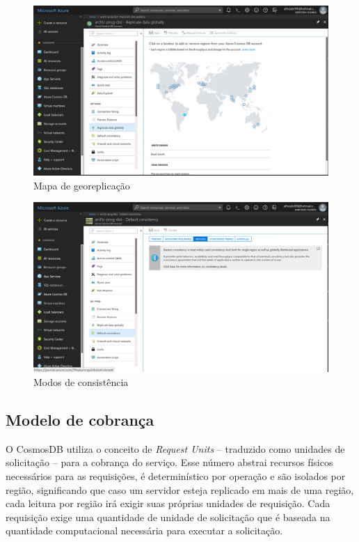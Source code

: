 \documentclass[12pt]{article}
\begin{document}
\begin{figure}[H]
	\label{fig:az4}
	\caption{Mapa de georeplicação}
	\includegraphics[scale=0.37]{img/az4.png}
	\centering
\end{figure}

\begin{figure}[H]
	\label{fig:az5}
	\caption{Modos de consistência}
	\includegraphics[scale=0.37]{img/az5.png}
	\centering
\end{figure}

\subsection{Modelo de cobrança}
O CosmosDB utiliza o conceito de \textit{Request Units} -- traduzido como unidades de solicitação -- para a cobrança do serviço. Esse número abstrai recursos físicos necessários para as requisições, é 
determinístico por operação e são isolados por região, significando que caso um servidor esteja replicado em mais de uma região, cada leitura por região irá exigir suas próprias unidades de requisição.
Cada requisição exige uma quantidade de unidade de solicitação que é baseada na quantidade computacional necessária para executar a solicitação.
\end{document}
